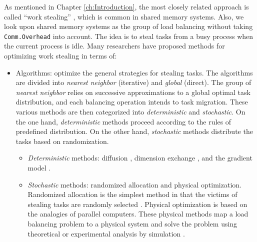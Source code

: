 
As mentioned in Chapter \ref{ch:Introduction}, the most closely related approach is called ``work stealing'' \cite{Blumofe1999OriginWS}, which is common in shared memory systems. Also, we look upon shared memory systems as the group of load balancing without taking \texttt{Comm.Overhead} into account. The idea is to steal tasks from a busy process when the current process is idle. Many researchers have proposed methods for optimizing work stealing in terms of:

\begin{itemize}
	\item Algorithms: optimize the general strategies for stealing tasks. The algorithms are divided into \textit{nearest neighbor} (iterative) and \textit{global} (direct). The group of \textit{nearest neighbor} relies on successive approximations to a global optimal task distribution, and each balancing operation intends to task migration. These various methods are then categorized into \textit{deterministic} and \textit{stochastic}. On the one hand, \textit{deterministic} methods proceed according to the rules of predefined distribution. On the other hand, \textit{stochastic} methods distribute the tasks based on randomization.
	\begin{itemize}
		\item \textit{Deterministic} methods: diffusion \cite{halstead1980munet} \cite{sullivan1977large}, dimension exchange \cite{ranka1988programming}, and the gradient model \cite{lin1987gradient}. 
		\item \textit{Stochastic} methods: randomized allocation and physical optimization. Randomized allocation is the simplest method in that the victims of stealing tasks are randomly selected \cite{adler1998parallel}. Physical optimization is based on the analogies of parallel computers. These physical methods map a load balancing problem to a physical system and solve the problem using theoretical or experimental analysis by simulation \cite{rudolph1991simple}.
	\end{itemize}
	

\end{itemize}
